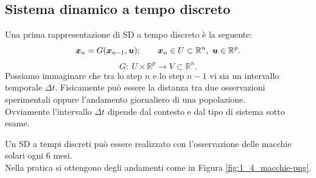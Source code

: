 \subsection{Sistema dinamico a tempo discreto}%
\label{sub:Sistema dinamico a tempo discreto}
Una prima rappresentazione di SD a tempo discreto
è la seguente:
\[
    \boldsymbol{x}_n = G(\boldsymbol{x}_{n-1}, \boldsymbol{u}); \qquad \boldsymbol{x}_n \in U \subset \mathbb{R}^n, \ \boldsymbol{u}  \in \mathbb{R}^p
.\] 
\[
    G: \ U\times \mathbb{R}^p \to V \subset \mathbb{R}^n
.\] 
Possiamo immaginare che tra lo step $n$ e lo step $n-1$ vi sia un intervallo temporale $\Delta t$. Fisicamente può essere la distanza tra due osservazioni sperimentali oppure l'andamento giornaliero di una popolazione. \\
Ovviamente l'intervallo $\Delta t$ dipende dal contesto e dal tipo di sistema sotto esame.
\begin{exmp}
    Un SD a tempi discreti può essere realizzato con l'osservazione delle macchie solari ogni 6 mesi. \\
    Nella pratica si ottengono degli andamenti come in Figura \ref{fig:1_4_macchie-png}.
\end{exmp}
